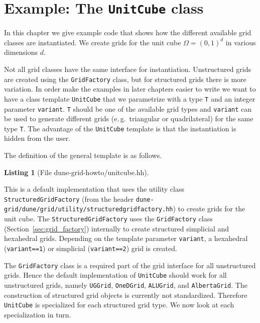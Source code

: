 \documentclass[11pt,a4paper,headinclude,footinclude,DIV16,normalheadings]{scrreprt}
\newtheorem{lst}{Listing}
\begin{document}
\section{Example: The \texorpdfstring{\lstinline{UnitCube}}{UnitCube} class}

In this chapter we give example code that shows how the different available grid
classes are instantiated. We create grids for the unit
cube $\Omega=(0,1)^d$ in various dimensions $d$.

Not all grid classes have the same interface for instantiation.
Unstructured grids are created using the \lstinline!GridFactory! class,
but for structured grids there is more variation.  In order make the
examples in later chapters easier to write we want to have a class template
\lstinline!UnitCube! that we parametrize with a type \lstinline!T! and
an integer parameter \lstinline!variant!. \lstinline!T! should be
one of the available grid types and \lstinline!variant! can be used to
generate different grids (e.\,g.~triangular or quadrilateral) for the
same type \lstinline!T!. The advantage of the \lstinline!UnitCube!
template is that the instantiation is hidden from the user.

The definition of the general template is as follows.

\begin{lst}[File dune-grid-howto/unitcube.hh] \mbox{}
\nopagebreak

\end{lst}

This is a default implementation that uses the utility class
\lstinline!StructuredGridFactory! (from the header \lstinline!dune-grid/dune/grid/utility/structuredgridfactory.hh!)
to create grids for the unit cube.  The \lstinline!StructuredGridFactory!
uses the \lstinline!GridFactory! class (Section~\ref{sec:grid_factory})
internally to create structured simplicial and hexahedral grids.
Depending on the template parameter \lstinline!variant!, a
hexahedral (\lstinline!variant==1!) or simplicial (\lstinline!variant==2!)
grid is created.

The \lstinline!GridFactory! class is a required part of the grid interface
for all unstructured grids.  Hence the default implementation of \lstinline!UnitCube!
should work for all unstructured grids, namely \lstinline!UGGrid!,
\lstinline!OneDGrid!, \lstinline!ALUGrid!, and \lstinline!AlbertaGrid!.
The construction of structured grid objects is currently not standardized.
Therefore \lstinline!UnitCube! is specialized for each structured grid
type.  We now look at each specialization in turn.
\end{document}
